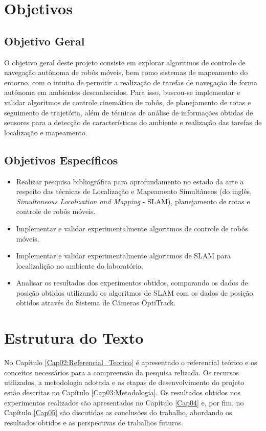 \section{Objetivos}

\subsection{Objetivo Geral}

O objetivo geral deste projeto consiste em explorar algoritmos de controle de navegação autônoma de robôs móveis, bem como sistemas de mapeamento do entorno, com o intuito de permitir a realização de tarefas de navegação de forma autônoma em ambientes desconhecidos. Para isso, buscou-se implementar e validar algoritmos de controle cinemático de robôs, de planejamento de rotas e seguimento de trajetória, além de técnicas de análise de informações obtidas de sensores para a detecção de características do ambiente e realização das tarefas de localização e mapeamento.

\subsection{Objetivos Específicos}

\begin{itemize}
\item
Realizar pesquisa bibliográfica para aprofundamento no estado da arte a respeito das técnicas de Localização e Mapeamento Simultâneos (do inglês, \textit{Simultaneous Localization and Mapping} - SLAM), planejamento de rotas e controle de robôs móveis.
\item
Implementar e validar experimentalmente algoritmos de controle de robôs móveis.
\item
Implementar e validar experimentalmente algoritmos de SLAM para localizalição no ambiente do laboratório.
\item
Analisar os resultados dos experimentos obtidos, comparando os dados de posição obtidos utilizando os algoritmos de SLAM com os dados de posição obtidos através do Sistema de Câmeras OptiTrack.
\end{itemize}

\section{Estrutura do Texto}

No Capítulo \ref{Cap02:Referencial_Teorico} é apresentado o referencial teórico e os conceitos necessários para a compreensão da pesquisa relizada. Os recursos utilizados, a metodologia adotada e as etapas de desenvolvimento do projeto estão descritas no Capítulo \ref{Cap03:Metodologia}. Os resultados obtidos nos experimentos realizados são apresentados no Capítulo \ref{Cap04} e, por fim, no Capítulo \ref{Cap05} são discutidas as conclusões do trabalho, abordando os resultados obtidos e as perspectivas de trabalhos futuros.
